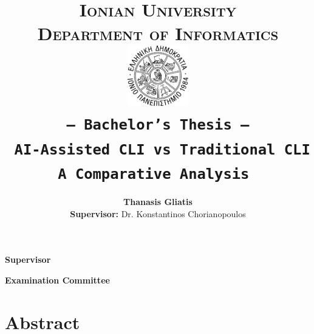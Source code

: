 \documentclass[a4paper,11pt,oneside,openany]{styles/ioniothesis}
\begin{document}
\author{\textbf{Thanasis Gliatis} \\ \textbf{Supervisor:}  Dr. Konstantinos Chorianopoulos}
\title{
	\textbf{\LARGE{\textsc{Ionian University}}
		\bigskip \\
		\large{\textsc{Department of Informatics}}
		\bigskip \\ \bigskip \bigskip \bigskip
		\bigskip \bigskip
		\includegraphics[width=0.2\textwidth]{./assets/figures/ionio_logo.pdf}
		\bigskip \\ \bigskip
		\texttt{\large{-- Bachelor's Thesis --}}
		\bigskip \\ \bigskip
		\textbf{\Large{\texttt{
			AI-Assisted CLI vs Traditional CLI \\
			A Comparative Analysis
		}}}
		\bigskip \\ \bigskip}
}
\maketitle


\pagestyle{empty}
\cleardoublepage


\chapter*{}
\thispagestyle{empty}

\begin{center}
	\Large{\textbf{Supervisor}}
\end{center}

\begin{center}
	\Large{\textbf{Examination Committee}}
\end{center}


\pagestyle{empty}
\cleardoublepage


\chapter*{Abstract} \pagestyle{headings}

\end{document}
